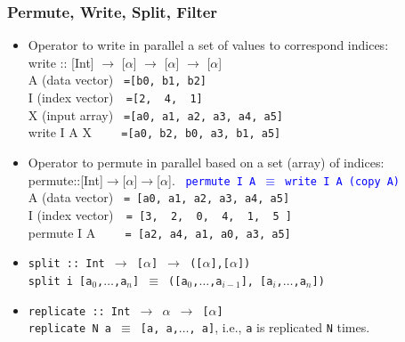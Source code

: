 \documentclass{beamer}
\newcommand{\blue}[1]{\textcolor{Blue}{{#1}}}
\renewcommand{\emph}[1]{\textcolor{structure}{#1}}
\newcommand{\emp}[1]{\textcolor{DikuRed}{ #1}}
\begin{document}
\begin{frame}[fragile,t]
  \frametitle{Permute, Write, Split, Filter}

\begin{itemize}
    \item Operator to \emph{write in parallel} a set of values to 
            correspond indices:\\
          \emph{write :: [Int] $\rightarrow$ [$\alpha$] $\rightarrow$ [$\alpha$] $\rightarrow$ [$\alpha$]}\\
          A (data vector) {\tt~=[b0, b1, b2]}\\
          I (index vector){\tt~~=[2,~~4,~~1]}\\
          X (input array) {\tt~=[a0,~a1,~a2,~a3,~a4,~a5]}\\
          \emp{write I A X     {\tt~~~~=[a0,~b2,~b0,~a3,~b1,~a5]}}\bigskip

    \item Operator to \emph{permute in parallel} based on a set (array) of indices:\\
          \emph{permute::[Int]$\rightarrow$[$\alpha$]$\rightarrow$[$\alpha$]}. {\small~\blue{\tt permute~I~A~$\equiv$~write~I~A~(copy~A)}}\\
           A (data vector) {\tt~= [a0,~a1,~a2,~a3,~a4,~a5]}\\
           I (index vector){\tt~~= [3,~~2,~~0,~~4,~~1,~~5~]}\\
           \emp{permute I A     {\tt~~~~= [a2,~a4,~a1,~a0,~a3,~a5]}}\\\bigskip
           

    \item %
          \emph{\tt split :: Int $\rightarrow$ [$\alpha$] $\rightarrow$ ([$\alpha$],[$\alpha$])}\\
          \emp{\tt split i [a$_0$,$\ldots$,a$_n$] $\equiv$ ([a$_0$,$\ldots$,a$_{i-1}$], [a$_i$,$\ldots$,a$_{n}$])}\smallskip
    \item \emph{\tt replicate :: Int $\rightarrow$ $\alpha$ $\rightarrow$ [$\alpha$]}\\
            \emp{\tt replicate N a $\equiv$ [a, a,$\ldots$, a]}, i.e., {\tt a} is replicated {\tt N} times.  
 
\end  {itemize}

\end{frame}
\end{document}
